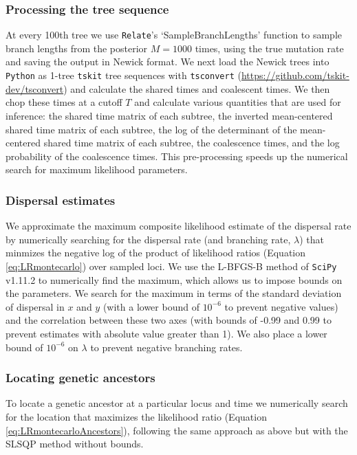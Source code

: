 \documentclass[12pt]{article}
\begin{document}
\subsubsection*{Processing the tree sequence}
  
At every 100th tree we use \texttt{Relate}'s `SampleBranchLengths' function to sample branch lengths from the posterior $M=1000$ times, using the true mutation rate and saving the output in Newick format.
We next load the Newick trees into \texttt{Python} as 1-tree \texttt{tskit} tree sequences with \texttt{tsconvert} (\url{https://github.com/tskit-dev/tsconvert}) and calculate the shared times and coalescent times.
We then chop these times at a cutoff $T$ and calculate various quantities that are used for inference: the shared time matrix of each subtree, the inverted mean-centered shared time matrix of each subtree, the log of the determinant of the mean-centered shared time matrix of each subtree, the coalescence times, and the log probability of the coalescence times.
This pre-processing speeds up the numerical search for maximum likelihood parameters.

\subsubsection*{Dispersal estimates}

We approximate the maximum composite likelihood estimate of the dispersal rate by numerically searching for the dispersal rate (and branching rate, $\lambda$) that minmizes the negative log of the product of likelihood ratios (Equation \eqref{eq:LRmontecarlo}) over sampled loci.
We use the L-BFGS-B method of \texttt{SciPy} v1.11.2 \citep{2020SciPy-NMeth} to numerically find the maximum, which allows us to impose bounds on the parameters.
We search for the maximum in terms of the standard deviation of dispersal in $x$ and $y$ (with a lower bound of $10^{-6}$ to prevent negative values) and the correlation between these two axes (with bounds of -0.99 and 0.99 to prevent estimates with absolute value greater than 1). 
We also place a lower bound of $10^{-6}$ on $\lambda$ to prevent negative branching rates.

\subsubsection*{Locating genetic ancestors}

To locate a genetic ancestor at a particular locus and time we numerically search for the location that maximizes the likelihood ratio (Equation \eqref{eq:LRmontecarloAncestors}), following the same approach as above but with the SLSQP method without bounds.
\end{document}
